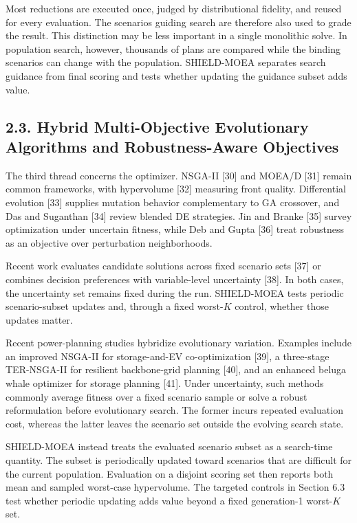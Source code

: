 \documentclass[
  10pt,
  a4paper,
]{article}
\begin{document}
Most reductions are executed once, judged by distributional fidelity,
and reused for every evaluation. The scenarios guiding search are
therefore also used to grade the result. This distinction may be less
important in a single monolithic solve. In population search, however,
thousands of plans are compared while the binding scenarios can change
with the population. SHIELD-MOEA separates search guidance from final
scoring and tests whether updating the guidance subset adds value.

\subsection{2.3. Hybrid Multi-Objective Evolutionary Algorithms and
Robustness-Aware
Objectives}\label{hybrid-multi-objective-evolutionary-algorithms-and-robustness-aware-objectives}

The third thread concerns the optimizer. NSGA-II {[}30{]} and MOEA/D
{[}31{]} remain common frameworks, with hypervolume {[}32{]} measuring
front quality. Differential evolution {[}33{]} supplies mutation
behavior complementary to GA crossover, and Das and Suganthan {[}34{]}
review blended DE strategies. Jin and Branke {[}35{]} survey
optimization under uncertain fitness, while Deb and Gupta {[}36{]} treat
robustness as an objective over perturbation neighborhoods.

Recent work evaluates candidate solutions across fixed scenario sets
{[}37{]} or combines decision preferences with variable-level
uncertainty {[}38{]}. In both cases, the uncertainty set remains fixed
during the run. SHIELD-MOEA tests periodic scenario-subset updates and,
through a fixed worst-\(K\) control, whether those updates matter.

Recent power-planning studies hybridize evolutionary variation. Examples
include an improved NSGA-II for storage-and-EV co-optimization {[}39{]},
a three-stage TER-NSGA-II for resilient backbone-grid planning {[}40{]},
and an enhanced beluga whale optimizer for storage planning {[}41{]}.
Under uncertainty, such methods commonly average fitness over a fixed
scenario sample or solve a robust reformulation before evolutionary
search. The former incurs repeated evaluation cost, whereas the latter
leaves the scenario set outside the evolving search state.

SHIELD-MOEA instead treats the evaluated scenario subset as a
search-time quantity. The subset is periodically updated toward
scenarios that are difficult for the current population. Evaluation on a
disjoint scoring set then reports both mean and sampled worst-case
hypervolume. The targeted controls in Section 6.3 test whether periodic
updating adds value beyond a fixed generation-1 worst-\(K\) set.
\end{document}
